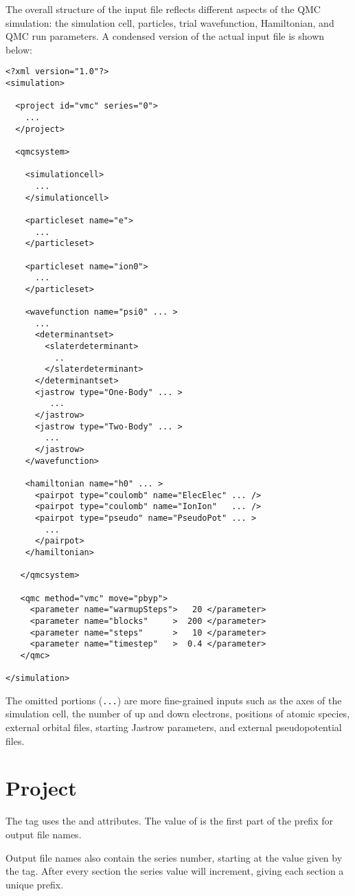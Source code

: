 The overall structure of the input file reflects different aspects of the QMC simulation: the simulation cell, particles, trial wavefunction, Hamiltonian, and QMC run parameters.  A condensed version of the actual input file is shown below:
\begin{lstlisting}[style=QMCPXML]
<?xml version="1.0"?>
<simulation>

  <project id="vmc" series="0">
    ...
  </project>

  <qmcsystem>

    <simulationcell>
      ...
    </simulationcell>

    <particleset name="e">
      ...
    </particleset>

    <particleset name="ion0">
      ...
    </particleset>

    <wavefunction name="psi0" ... >
      ...
      <determinantset>
        <slaterdeterminant>
          ..
        </slaterdeterminant>
      </determinantset>
      <jastrow type="One-Body" ... >
         ...
      </jastrow>
      <jastrow type="Two-Body" ... >
        ...
      </jastrow>
    </wavefunction>

    <hamiltonian name="h0" ... >
      <pairpot type="coulomb" name="ElecElec" ... />
      <pairpot type="coulomb" name="IonIon"   ... />
      <pairpot type="pseudo" name="PseudoPot" ... >
        ...
      </pairpot>
    </hamiltonian>

   </qmcsystem>

   <qmc method="vmc" move="pbyp">
     <parameter name="warmupSteps">   20 </parameter>
     <parameter name="blocks"     >  200 </parameter>
     <parameter name="steps"      >   10 </parameter>
     <parameter name="timestep"   >  0.4 </parameter>
   </qmc>

</simulation>
\end{lstlisting}
The omitted portions (\texttt{...}) are more fine-grained inputs such as the axes of the simulation cell, the number of up and down electrons, positions of atomic species, external orbital files, starting Jastrow parameters, and external pseudopotential files.  


\section{Project}
The  tag uses the  and  attributes.
The value of  is the first part of the prefix for output file names.

Output file names also contain the series number, starting at the value given by the
 tag.  After every  section the series value will increment, giving each section a unique prefix.

